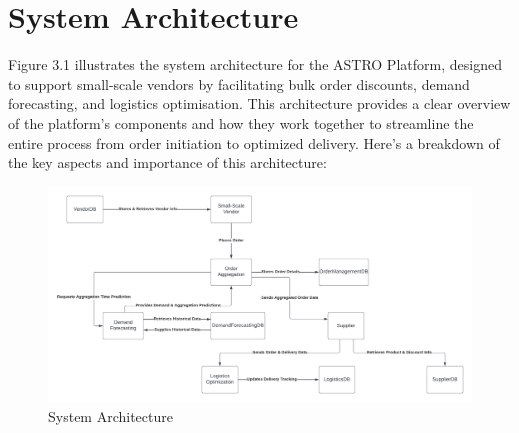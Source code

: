 
\chapter{System Architecture}



\noindent Figure 3.1 illustrates the system architecture for the ASTRO Platform, designed to support small-scale vendors by facilitating bulk order discounts, demand forecasting, and logistics optimisation. This architecture provides a clear overview of the platform’s components and how they work together to streamline the entire process from order initiation to optimized delivery. Here’s a breakdown of the key aspects and importance of this architecture:

\begin{figure}[h]
    \centering
    \includegraphics[width=\textwidth]{Figures/system_archh.png}
    \caption{System Architecture}
    \label{fig:architecture}
\end{figure}


